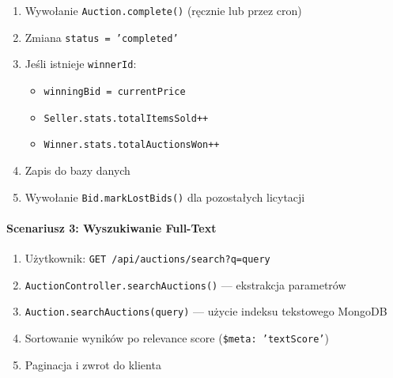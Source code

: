 \begin{enumerate}
  \item Wywołanie \texttt{Auction.complete()} (ręcznie lub przez cron)
  \item Zmiana \texttt{status = 'completed'}
  \item Jeśli istnieje \texttt{winnerId}:
        \begin{itemize}
          \item \texttt{winningBid = currentPrice}
          \item \texttt{Seller.stats.totalItemsSold++}
          \item \texttt{Winner.stats.totalAuctionsWon++}
        \end{itemize}
  \item Zapis do bazy danych
  \item Wywołanie \texttt{Bid.markLostBids()} dla pozostałych licytacji
\end{enumerate}

\paragraph{Scenariusz 3: Wyszukiwanie Full-Text}

\begin{enumerate}
  \item Użytkownik: \texttt{GET /api/auctions/search?q=query}
  \item \texttt{AuctionController.searchAuctions()} --- ekstrakcja parametrów
  \item \texttt{Auction.searchAuctions(query)} --- użycie indeksu tekstowego MongoDB
  \item Sortowanie wyników po relevance score (\texttt{\$meta: 'textScore'})
  \item Paginacja i zwrot do klienta
\end{enumerate}

